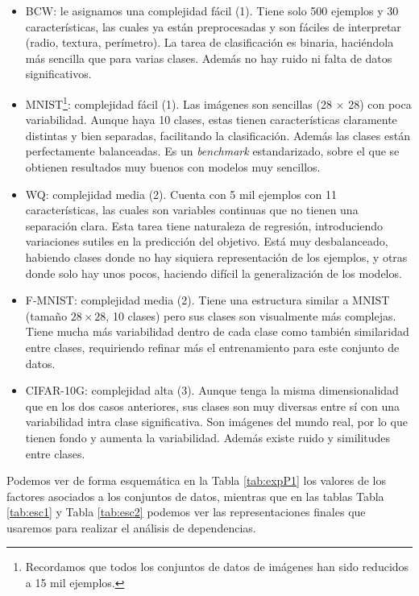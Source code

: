\begin{itemize}

\item BCW: le asignamos una complejidad fácil (1). Tiene solo 500 ejemplos y 30 características, las cuales ya están preprocesadas y son fáciles de interpretar (radio, textura, perímetro). La tarea de clasificación es binaria, haciéndola más sencilla que para varias clases. Además no hay ruido ni falta de datos significativos.

\item MNIST\footnote{Recordamos que todos los conjuntos de datos de imágenes han sido reducidos a 15 mil ejemplos.}: complejidad fácil (1). Las imágenes son sencillas (28 $\times$ 28) con poca variabilidad. Aunque haya 10 clases, estas tienen características claramente distintas y bien separadas, facilitando la clasificación. Además las clases están perfectamente balanceadas. Es un \textit{benchmark} estandarizado, sobre el que se obtienen resultados muy buenos con modelos muy sencillos.

\item WQ: complejidad media (2). Cuenta con 5 mil ejemplos con 11 características, las cuales son variables continuas que no tienen una separación clara. Esta tarea tiene naturaleza de regresión, introduciendo variaciones sutiles en la predicción del objetivo. Está muy desbalanceado, habiendo clases donde no hay siquiera representación de los ejemplos, y otras donde solo hay unos pocos, haciendo difícil la generalización de los modelos.

\item F-MNIST: complejidad media (2). Tiene una estructura similar a MNIST (tamaño $28 \times 28$, 10 clases) pero sus clases son visualmente más complejas. Tiene mucha más variabilidad dentro de cada clase como también similaridad entre clases, requiriendo refinar más el entrenamiento para este conjunto de datos.

\item CIFAR-10G: complejidad alta (3). Aunque tenga la misma dimensionalidad que en los dos casos anteriores, sus clases son muy diversas entre sí con una variabilidad intra clase significativa. Son imágenes del mundo real, por lo que tienen fondo y aumenta la variabilidad. Además existe ruido y similitudes entre clases.

\end{itemize}

Podemos ver de forma esquemática en la Tabla \ref{tab:expP1} los valores de los factores asociados a los conjuntos de datos, mientras que en las tablas Tabla \ref{tab:esc1} y Tabla \ref{tab:esc2} podemos ver las representaciones finales que usaremos para realizar el análisis de dependencias.





